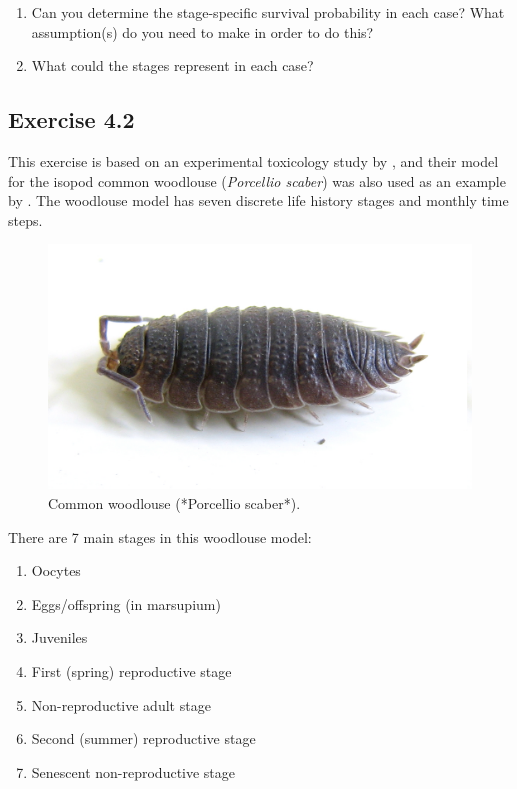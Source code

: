 \documentclass[
]{book}
\providecommand{\tightlist}{%
  \setlength{\itemsep}{0pt}\setlength{\parskip}{0pt}}
\begin{document}
\begin{enumerate}
\def\labelenumi{\arabic{enumi}.}
\setcounter{enumi}{1}
\item
  Can you determine the stage-specific survival probability in each case? What assumption(s) do you need to make in order to do this?
\item
  What could the stages represent in each case?
\end{enumerate}

\hypertarget{exercise-4.2}{%
\subsection*{Exercise 4.2}\label{exercise-4.2}}

This exercise is based on an experimental toxicology study by \citet{Kammenga1}, and their model for the isopod common woodlouse (\emph{Porcellio scaber}) was also used as an example by \citet{Vindenes2020}. The woodlouse model has seven discrete life history stages and monthly time steps.

\begin{figure}
\includegraphics[width=0.4\linewidth]{Porcellio_scaber} \caption{Common woodlouse (*Porcellio scaber*). }\label{fig:Porcellio1}
\end{figure}

There are 7 main stages in this woodlouse model:

\begin{enumerate}
\def\labelenumi{\arabic{enumi}.}
\tightlist
\item
  Oocytes\\
\item
  Eggs/offspring (in marsupium)\\
\item
  Juveniles\\
\item
  First (spring) reproductive stage\\
\item
  Non-reproductive adult stage\\
\item
  Second (summer) reproductive stage\\
\item
  Senescent non-reproductive stage
\end{enumerate}
\end{document}
